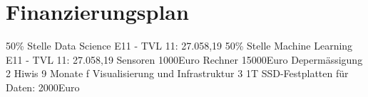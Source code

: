 \documentclass{article}
\begin{document}
\renewcommand{\thesection}{8}
\section{Finanzierungsplan}
50\% Stelle Data Science E11 - TVL 11: 27.058,19
50\% Stelle Machine Learning E11 - TVL 11: 27.058,19
Sensoren 1000Euro
Rechner 15000Euro
Depermässigung
2 Hiwis 9 Monate f Visualisierung und Infrastruktur
3 1T SSD-Festplatten für Daten: 2000Euro


\renewcommand{\refname}{}


%
\end{document}
